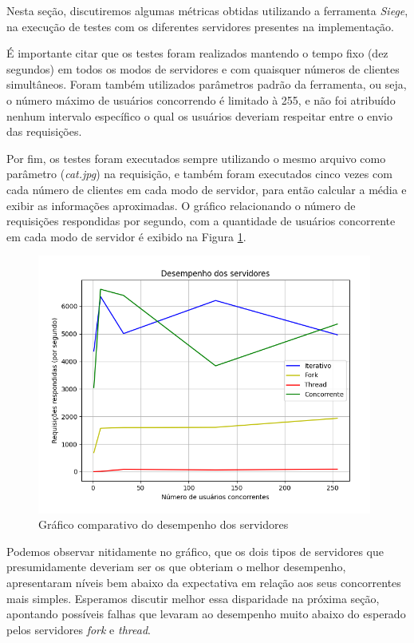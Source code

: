 \documentclass[a4paper, 12pt]{article}
\begin{document}
Nesta seção, discutiremos algumas métricas obtidas utilizando a ferramenta \emph{Siege}, na execução de testes com os diferentes servidores presentes na implementação.

É importante citar que os testes foram realizados mantendo o tempo fixo (dez segundos) em todos os modos de servidores e com quaisquer números de clientes simultâneos. Foram também utilizados parâmetros padrão da ferramenta, ou seja, o número máximo de usuários concorrendo é limitado à 255, e não foi atribuído nenhum intervalo específico o qual os usuários deveriam respeitar entre o envio das requisições. 

Por fim, os testes foram executados sempre utilizando o mesmo arquivo como parâmetro (\emph{cat.jpg}) na requisição, e também foram executados cinco vezes com cada número de clientes em cada modo de servidor, para então calcular a média e exibir as informações aproximadas. O gráfico relacionando o número de requisições respondidas por segundo, com a quantidade de usuários concorrente em cada modo de servidor é exibido na Figura \ref{fig:exampleFig1}.

\begin{figure}[H]
    \centering
    \includegraphics[width=0.98\textwidth]{Images/graph.png}
    \caption{Gráfico comparativo do desempenho dos servidores}
    \label{fig:exampleFig1}
\end{figure}

Podemos observar nitidamente no gráfico, que os dois tipos de servidores que presumidamente deveriam ser os que obteriam o melhor desempenho, apresentaram níveis bem abaixo da expectativa em relação aos seus concorrentes mais simples. Esperamos discutir melhor essa disparidade na próxima seção, apontando possíveis falhas que levaram ao desempenho muito abaixo do esperado pelos servidores \emph{fork} e \emph{thread}.
\end{document}

